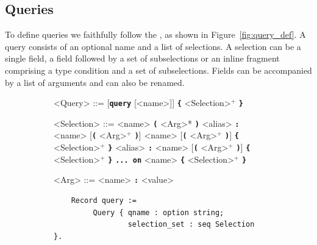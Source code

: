 

\subsection{Queries}\label{subsec:query}
To define queries we faithfully follow the \spec, as shown in Figure~\ref{fig:query_def}. A query consists of an optional name and a list of selections. A selection can be a single field, a field followed by a set of subselections or an inline fragment comprising a type condition and a set of subselections. Fields can be accompanied by a list of arguments and can also be renamed.

\begin{figure}[h]
  \centering
  \begin{subfigure}{.5\textwidth}
    \begin{grammar}
    		<Query> ::= [\textbf{\texttt{query}} [<name>]] \textbf{\texttt{\{}} <Selection>$^{+}$ \textbf{\texttt{\}}}
		
        <Selection> ::= <name> \textbf{\texttt{(}} <Arg>* \textbf{\texttt{)}}
        \alt <alias> \textbf{\texttt{:}} <name> [\textbf{\texttt{(}} <Arg>$^{+}$ \textbf{\texttt{)}}]
        \alt <name> [\textbf{\texttt{(}} <Arg>$^{+}$ \textbf{\texttt{)}}] \textbf{\texttt{\{}} <Selection>$^{+}$ \textbf{\texttt{\}}}
        \alt <alias> \textbf{\texttt{:}} <name> [\textbf{\texttt{(}} <Arg>$^{+}$ \textbf{\texttt{)}}] \textbf{\texttt{\{}} <Selection>$^{+}$ \textbf{\texttt{\}}}
        \alt \textbf{\texttt{... on}} <name> \textbf{\texttt{\{}} <Selection>$^{+}$ \textbf{\texttt{\}}}
        
        <Arg> ::= <name> \textbf{\texttt{:}} <value>
    \end{grammar}
  \end{subfigure}%
  \begin{subfigure}{.5\textwidth}

    \begin{verbatim}
    Record query := 
         Query { qname : option string; 
                 selection_set : seq Selection }.
                   

\end{verbatim}
\end{subfigure}
\end{figure}
